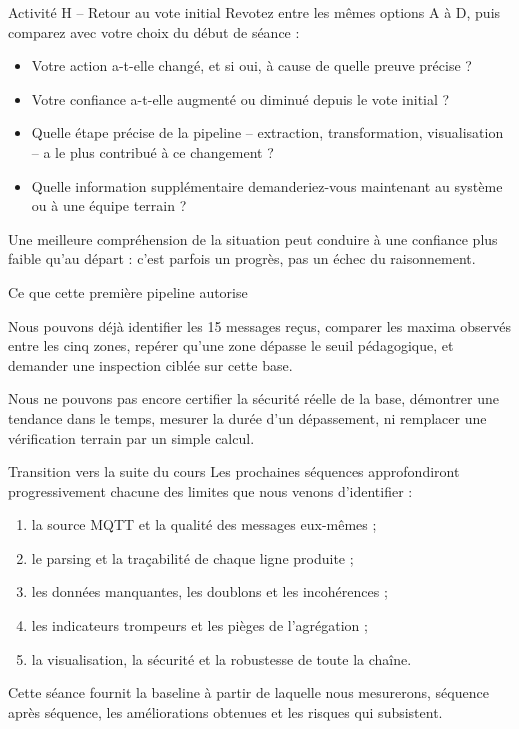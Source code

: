 \documentclass[aspectratio=169]{beamer}
\begin{document}
\begin{frame}{Activité H -- Retour au vote initial}
  Revotez entre les mêmes options A à D, puis comparez avec votre choix du début de séance :
  \begin{itemize}
    \item Votre action a-t-elle changé, et si oui, à cause de quelle preuve précise ?
    \item Votre confiance a-t-elle augmenté ou diminué depuis le vote initial ?
    \item Quelle étape précise de la pipeline -- extraction, transformation, visualisation -- a le plus contribué à ce changement ?
    \item Quelle information supplémentaire demanderiez-vous maintenant au système ou à une équipe terrain ?
  \end{itemize}
  \vfill
  \alert{Une meilleure compréhension de la situation peut conduire à une confiance plus faible qu'au départ : c'est parfois un progrès, pas un échec du raisonnement.}
\end{frame}

\begin{frame}{Ce que cette première pipeline autorise}
  \begin{block}{Nous pouvons déjà}
    identifier les 15 messages reçus, comparer les maxima observés entre les cinq zones, repérer qu'une zone dépasse le seuil pédagogique, et demander une inspection ciblée sur cette base.
  \end{block}
  \begin{alertblock}{Nous ne pouvons pas encore}
    certifier la sécurité réelle de la base, démontrer une tendance dans le temps, mesurer la durée d'un dépassement, ni remplacer une vérification terrain par un simple calcul.
  \end{alertblock}
\end{frame}

\begin{frame}{Transition vers la suite du cours}
  Les prochaines séquences approfondiront progressivement chacune des limites que nous venons d'identifier :
  \begin{enumerate}
    \item la source MQTT et la qualité des messages eux-mêmes ;
    \item le parsing et la traçabilité de chaque ligne produite ;
    \item les données manquantes, les doublons et les incohérences ;
    \item les indicateurs trompeurs et les pièges de l'agrégation ;
    \item la visualisation, la sécurité et la robustesse de toute la chaîne.
  \end{enumerate}
  \vfill
  Cette séance fournit la baseline à partir de laquelle nous mesurerons, séquence après séquence, les améliorations obtenues et les risques qui subsistent.
\end{frame}
\end{document}
